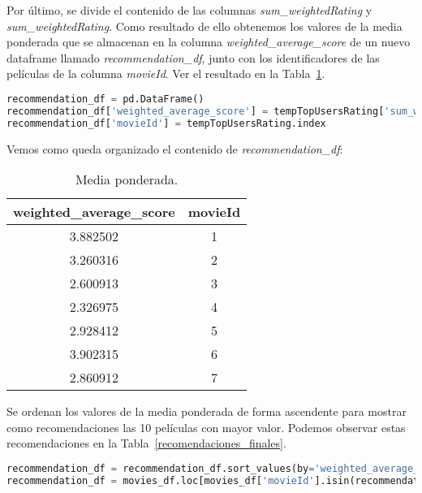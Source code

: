 \documentclass{uimppracticas}
\begin{document}
Por último, se divide el contenido de las columnas \textit{sum\_weightedRating} y \textit{sum\_weightedRating}. Como resultado de ello obtenemos los valores de la media ponderada que se almacenan en la columna \textit{weighted\_average\_score} de un nuevo dataframe llamado \textit{recommendation\_df}, junto con los identificadores de las películas de la columna \textit{movieId}. Ver el resultado en la Tabla~\ref{promedio_ponderado_resultado}.

\begin{lstlisting}[language=python, basicstyle=\small]
recommendation_df = pd.DataFrame()
recommendation_df['weighted_average_score'] = tempTopUsersRating['sum_weightedRating']/tempTopUsersRating['sum_similarityIndex']
recommendation_df['movieId'] = tempTopUsersRating.index
\end{lstlisting}

Vemos como queda organizado el contenido de \textit{recommendation\_df}:

\begin{table}[H]
	\centering
	\begin{tabular}{cc}
		\toprule
		weighted\_average\_score &  movieId \\
		\midrule
		3.882502 &        1 \\
		3.260316 &        2 \\
		2.600913 &        3 \\
		2.326975 &        4 \\
		2.928412 &        5 \\
		3.902315 &        6 \\
		2.860912 &        7 \\
		\bottomrule
	\end{tabular}
	\caption{Media ponderada.}
	\label{promedio_ponderado_resultado}
\end{table}

Se ordenan los valores de la media ponderada de forma ascendente para mostrar como recomendaciones las 10 películas con mayor valor. Podemos observar estas recomendaciones en la Tabla~\ref{recomendaciones_finales}.

\begin{lstlisting}[language=python, basicstyle=\small]
recommendation_df = recommendation_df.sort_values(by='weighted_average_score', ascending=False)
recommendation_df = movies_df.loc[movies_df['movieId'].isin(recommendation_df.head(10)['movieId'].tolist())]
\end{lstlisting}
\end{document}
